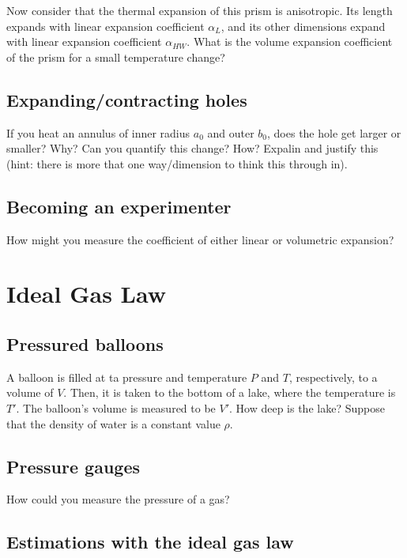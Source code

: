 \documentclass{article}
\begin{document}
Now consider that the thermal expansion of this prism is anisotropic. Its length expands with linear expansion coefficient $\alpha_L$, and its other dimensions expand with linear expansion coefficient $\alpha_{HW}$. What is the volume expansion coefficient of the prism for a small temperature change?

\subsection{Expanding/contracting holes}

If you heat an annulus of inner radius $a_0$ and outer $b_0$, does the hole get larger or smaller? Why? Can you quantify this change? How? Expalin and justify this (hint: there is more that one way/dimension to think this through in).

\subsection{Becoming an experimenter}

How might you measure the coefficient of either linear or volumetric expansion?

\newpage

\section{Ideal Gas Law}

\subsection{Pressured balloons}

A balloon is filled at ta pressure and temperature $P$ and $T$, respectively, to a volume of $V$. Then, it is taken to the bottom of a lake, where the temperature is $T'$. The balloon's volume is measured to be $V'$. How deep is the lake? Suppose that the density of water is a constant value $\rho$.

\subsection{Pressure gauges}

How could you measure the pressure of a gas?

\subsection{Estimations with the ideal gas law}
\end{document}
